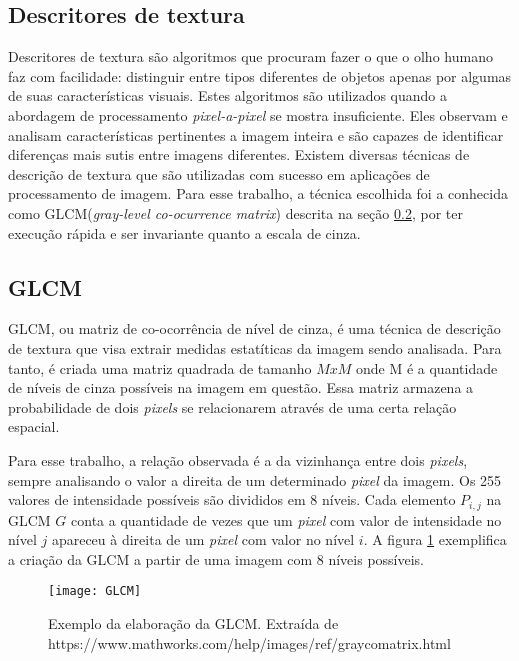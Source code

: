 \subsection{Descritores de textura}\label{sec:descritores}

Descritores de textura são algoritmos que procuram fazer o que o olho humano faz com facilidade: distinguir entre tipos diferentes de objetos apenas por algumas de suas características visuais. Estes algoritmos são utilizados quando a abordagem de processamento \textit{pixel-a-pixel} se mostra insuficiente. Eles observam e analisam características pertinentes a imagem inteira e são capazes de identificar diferenças mais sutis entre imagens diferentes. Existem diversas técnicas de descrição de textura que são utilizadas com sucesso em aplicações de processamento de imagem. Para esse trabalho, a técnica escolhida foi a conhecida como GLCM(\textit{gray-level co-ocurrence matrix}) descrita na seção \ref{sec:GLCM}, por ter execução rápida e ser invariante quanto a escala de cinza.

\subsection{GLCM}\label{sec:GLCM}

GLCM, ou matriz de co-ocorrência de nível de cinza, é uma técnica de descrição de textura que visa extrair medidas estatíticas da imagem sendo analisada. Para tanto, é criada uma matriz quadrada de tamanho $MxM$ onde M é a quantidade de níveis de cinza possíveis na imagem em questão. Essa matriz armazena a probabilidade de dois \textit{pixels} se relacionarem através de uma certa relação espacial\cite{GLCM}. 

Para esse trabalho, a relação observada é a da vizinhança entre dois \textit{pixels}, sempre analisando o valor a direita de um determinado \textit{pixel} da imagem. Os 255 valores de intensidade possíveis são divididos em 8 níveis. Cada elemento $P_{i,j}$ na GLCM $G$ conta a quantidade de vezes que um \textit{pixel} com valor de intensidade no nível $j$ apareceu à direita de um \textit{pixel} com valor no nível $i$. A figura \ref{fig:GLCM} exemplifica a criação da GLCM a partir de uma imagem com 8 níveis possíveis.

\begin{figure}
\texttt{[image: GLCM]} 
\centering
\caption{Exemplo da elaboração da GLCM. Extraída de https://www.mathworks.com/help/images/ref/graycomatrix.html}
\label{fig:GLCM}
\end{figure}

